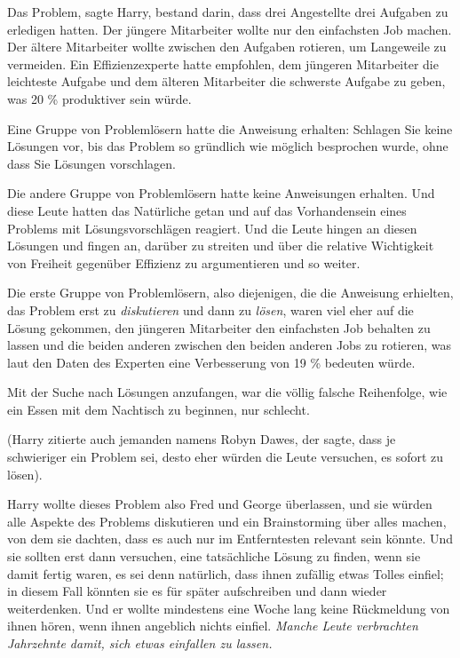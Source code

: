Das Problem, sagte Harry, bestand darin, dass drei Angestellte drei Aufgaben zu
erledigen hatten. Der jüngere Mitarbeiter wollte nur den einfachsten Job machen.
Der ältere Mitarbeiter wollte zwischen den Aufgaben rotieren, um Langeweile zu
vermeiden. Ein Effizienzexperte hatte empfohlen, dem jüngeren Mitarbeiter die
leichteste Aufgabe und dem älteren Mitarbeiter die schwerste Aufgabe zu geben,
was 20 \% produktiver sein würde.

Eine Gruppe von Problemlösern hatte die Anweisung erhalten: \glqq{}Schlagen Sie
keine Lösungen vor, bis das Problem so gründlich wie möglich besprochen wurde,
ohne dass Sie Lösungen vorschlagen.\grqq{}

Die andere Gruppe von Problemlösern hatte keine Anweisungen erhalten. Und diese
Leute hatten das Natürliche getan und auf das Vorhandensein eines Problems mit
Lösungsvorschlägen reagiert. Und die Leute hingen an diesen Lösungen und fingen
an, darüber zu streiten und über die relative Wichtigkeit von Freiheit gegenüber
Effizienz zu argumentieren und so weiter.

Die erste Gruppe von Problemlösern, also diejenigen, die die Anweisung
erhielten, das Problem erst zu \emph{diskutieren} und dann zu \emph{lösen},
waren viel eher auf die Lösung gekommen, den jüngeren Mitarbeiter den
einfachsten Job behalten zu lassen und die beiden anderen zwischen den beiden
anderen Jobs zu rotieren, was laut den Daten des Experten eine Verbesserung von
19 \% bedeuten würde.

Mit der Suche nach Lösungen anzufangen, war die völlig falsche Reihenfolge, wie
ein Essen mit dem Nachtisch zu beginnen, nur schlecht.

(Harry zitierte auch jemanden namens Robyn Dawes, der sagte, dass je schwieriger
ein Problem sei, desto eher würden die Leute versuchen, es sofort zu lösen).

Harry wollte dieses Problem also Fred und George überlassen, und sie würden alle
Aspekte des Problems diskutieren und ein Brainstorming über alles machen, von
dem sie dachten, dass es auch nur im Entferntesten relevant sein könnte. Und sie
sollten erst dann versuchen, eine tatsächliche Lösung zu finden, wenn sie damit
fertig waren, es sei denn natürlich, dass ihnen zufällig etwas Tolles einfiel;
in diesem Fall könnten sie es für später aufschreiben und dann wieder
weiterdenken. Und er wollte mindestens eine Woche lang keine Rückmeldung von
ihnen hören, wenn ihnen angeblich nichts einfiel. \emph{Manche Leute verbrachten
Jahrzehnte damit, sich etwas einfallen zu lassen.}

